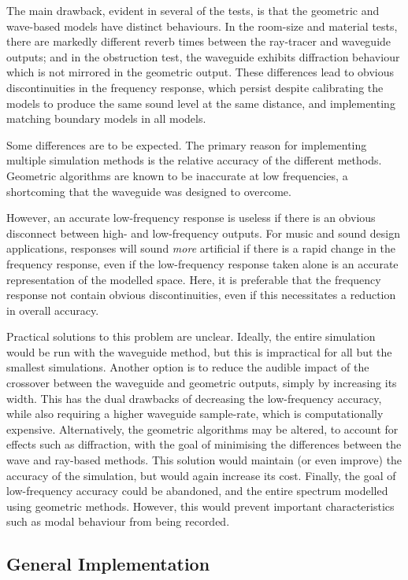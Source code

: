 \documentclass[]{scrreprt}
\begin{document}
The main drawback, evident in several of the tests, is that the
geometric and wave-based models have distinct behaviours. In the
room-size and material tests, there are markedly different reverb times
between the ray-tracer and waveguide outputs; and in the obstruction
test, the waveguide exhibits diffraction behaviour which is not mirrored
in the geometric output. These differences lead to obvious
discontinuities in the frequency response, which persist despite
calibrating the models to produce the same sound level at the same
distance, and implementing matching boundary models in all models.

Some differences are to be expected. The primary reason for implementing
multiple simulation methods is the relative accuracy of the different
methods. Geometric algorithms are known to be inaccurate at low
frequencies, a shortcoming that the waveguide was designed to overcome.

However, an accurate low-frequency response is useless if there is an
obvious disconnect between high- and low-frequency outputs. For music
and sound design applications, responses will sound \emph{more}
artificial if there is a rapid change in the frequency response, even if
the low-frequency response taken alone is an accurate representation of
the modelled space. Here, it is preferable that the frequency response
not contain obvious discontinuities, even if this necessitates a
reduction in overall accuracy.

Practical solutions to this problem are unclear. Ideally, the entire
simulation would be run with the waveguide method, but this is
impractical for all but the smallest simulations. Another option is to
reduce the audible impact of the crossover between the waveguide and
geometric outputs, simply by increasing its width. This has the dual
drawbacks of decreasing the low-frequency accuracy, while also requiring
a higher waveguide sample-rate, which is computationally expensive.
Alternatively, the geometric algorithms may be altered, to account for
effects such as diffraction, with the goal of minimising the differences
between the wave and ray-based methods. This solution would maintain (or
even improve) the accuracy of the simulation, but would again increase
its cost. Finally, the goal of low-frequency accuracy could be
abandoned, and the entire spectrum modelled using geometric methods.
However, this would prevent important characteristics such as modal
behaviour from being recorded.

\subsection{General Implementation}\label{general-implementation}
\end{document}
